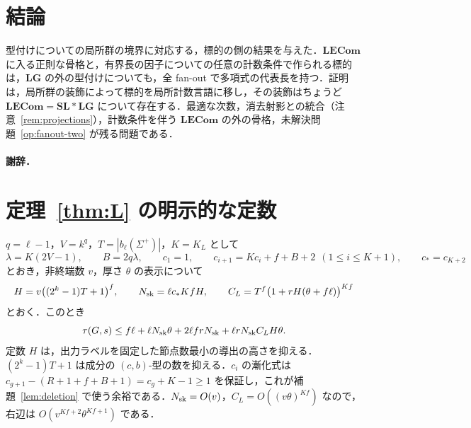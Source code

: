 \documentclass[11pt,a4paper]{ltjsarticle}
\numberwithin{equation}{section}
\theoremstyle{plain}
\theoremstyle{definition}
\theoremstyle{remark}
\theoremstyle{plain}
\newcommand{\LG}{\mathbf{LG}}
\newcommand{\SL}{\mathbf{SL}}
\newcommand{\LECom}{\mathbf{L}\mathbf{ECom}}
\newcommand{\Kocc}{K_L}
\begin{document}
\section{結論}
\label{sec:conclusion}

型付けについての局所群の境界に対応する，標的の側の結果を与えた．$\LECom$ に入る正則な骨格と，有界長の因子についての任意の計数条件で作られる標的は，$\LG$ の外の型付けについても，全 fan-out で多項式の代表長を持つ．証明は，局所群の装飾によって標的を局所計数言語に移し，その装飾はちょうど $\LECom=\SL*\LG$ について存在する．最適な次数，消去射影との統合（注意~\ref{rem:projections}），計数条件を伴う $\LECom$ の外の骨格，未解決問題~\ref{op:fanout-two} が残る問題である．

\paragraph{謝辞．}

\appendix
\section{定理~\ref{thm:L} の明示的な定数}
\label{app:constants}

$q=\ell-1$，$V=k^q$，$T=|b_\ell(\Sigma^+)|$，$K=\Kocc$ として
\[
 \lambda=K(2V-1),\qquad B=2q\lambda,\qquad c_1=1,\qquad
 c_{i+1}=Kc_i+f+B+2\ \ (1\le i\le K+1),\qquad c_*=c_{K+2}
\]
とおき，非終端数 $v$，厚さ $\theta$ の表示について
\[
 H=v\bigl((2^k-1)T+1\bigr)^f,\qquad N_{\rm sk}=\ell c_*KfH,\qquad
 C_L=T^f\bigl(1+rH(\theta+f\ell)\bigr)^{Kf}
\]
とおく．このとき
\begin{equation}
\label{eq:L-explicit}
 \tau(G,s)\le f\ell+\ell N_{\rm sk}\theta+2\ell frN_{\rm sk}
 +\ell rN_{\rm sk}C_LH\theta .
\end{equation}
定数 $H$ は，出力ラベルを固定した節点数最小の導出の高さを抑える．$(2^k-1)T+1$ は成分の $(c,b)$-型の数を抑える．$c_i$ の漸化式は $c_{g+1}-(R+1+f+B+1)=c_g+K-1\ge1$ を保証し，これが補題~\ref{lem:deletion} で使う余裕である．$N_{\rm sk}=O(v)$，$C_L=O((v\theta)^{Kf})$ なので，右辺は $O(v^{Kf+2}\theta^{Kf+1})$ である．
\end{document}

